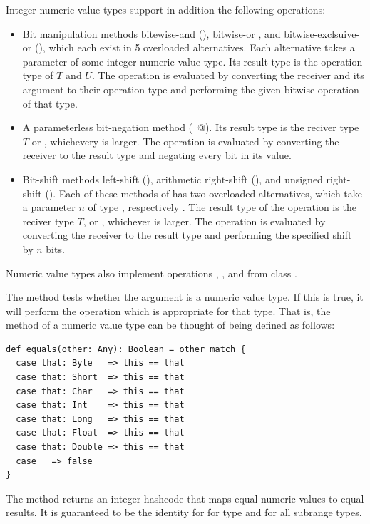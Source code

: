 {Integer numeric value types support in addition the following operations:
\begin{itemize}
\item 
Bit manipulation methods bitewise-and (\code{&}), bitwise-or
{\code{|}}, and bitwise-exclsuive-or (\code{^}), which each exist in 5
overloaded alternatives. Each alternative takes a parameter of some
integer numeric value type. Its result type is the operation type of
$T$ and $U$. The operation is evaluated by converting the receiver and
its argument to their operation type and performing the given bitwise
operation of that type.
\item
A parameterless bit-negation method (\lstinline@~@). Its result type is
the reciver type $T$ or , whichevery is larger.
The operation is evaluated by converting the receiver to the result
type and negating every bit in its value.
\item
Bit-shift methods left-shift (\code{<<}), arithmetic right-shift
(\code{>>}), and unsigned right-shift (\code{>>>}). Each of these
methods of has two overloaded alternatives, which take a parameter $n$
of type , respectively . The result type of the
operation is the reciver type $T$, or , whichever is larger.
The operation is evaluated by converting the receiver to the result
type and performing the specified shift by $n$ bits.
\end{itemize}

Numeric value types also implement operations ,
, and  from class .

The  method tests whether the argument is a numeric value
type. If this is true, it will perform the \code{==} operation which
is appropriate for that type. That is, the  method of a
numeric value type can be thought of being defined as follows:
\begin{lstlisting}
def equals(other: Any): Boolean = other match {
  case that: Byte   => this == that
  case that: Short  => this == that
  case that: Char   => this == that
  case that: Int    => this == that
  case that: Long   => this == that
  case that: Float  => this == that
  case that: Double => this == that
  case _ => false
}
\end{lstlisting}
The  method returns an integer hashcode that maps equal
numeric values to equal results. It is guaranteed to be the identity for 
for type  and for all subrange types.

}
